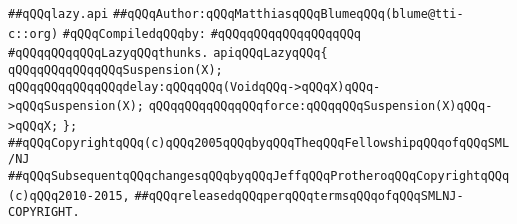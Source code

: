 \label{src/lib/std/src/nj/lazy.api}
\verb|##qQQqlazy.api|\newline
\verb|##qQQqAuthor:qQQqMatthiasqQQqBlumeqQQq(blume@tti-c::org)|\newline
\newline
\verb|#qQQqCompiledqQQqby:|\newline
\verb|#qQQqqQQqqQQqqQQqqQQq|\newline
\newline
\newline
\verb|#qQQqqQQqqQQqLazyqQQqthunks.|\newline
\newline
\verb|apiqQQqLazyqQQq{|\newline
\newline
\verb|qQQqqQQqqQQqqQQqSuspension(X);|\newline
\newline
\verb|qQQqqQQqqQQqqQQqdelay:qQQqqQQq(VoidqQQq->qQQqX)qQQq->qQQqSuspension(X);|\newline
\verb|qQQqqQQqqQQqqQQqforce:qQQqqQQqSuspension(X)qQQq->qQQqX;|\newline
\verb|};|\newline
\newline
\newline
\verb|##qQQqCopyrightqQQq(c)qQQq2005qQQqbyqQQqTheqQQqFellowshipqQQqofqQQqSML/NJ|\newline
\verb|##qQQqSubsequentqQQqchangesqQQqbyqQQqJeffqQQqProtheroqQQqCopyrightqQQq(c)qQQq2010-2015,|\newline
\verb|##qQQqreleasedqQQqperqQQqtermsqQQqofqQQqSMLNJ-COPYRIGHT.|\newline

